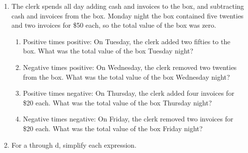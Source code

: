\documentclass[12pt]{article}
\begin{document}
\begin{enumerate}
\begin{multicols}{2}
\begin{enumerate}
    \item \hspace{0.250in} $-4-7$
  \vspace{0.25in}

    \item \hspace{0.250in} $0-(-7)$
  \vspace{0.25in}

    \item \hspace{0.250in} $10-12$
  \vspace{0.25in}

\end{enumerate}
\end{multicols}

\pagebreak

	\item The clerk spends all day adding cash and invoices to the box, and subtracting cash and invoices from the box. Monday night the box contained five twenties and two invoices for \$50 each, so the total value of the box was zero. 

    \begin{enumerate}
  	\item Positive times positive: On Tuesday, the clerk added two fifties to the box. What was the total value of the box Tuesday night? 
	    \vspace{0.50in}

	\item Negative times positive: On Wednesday, the clerk removed two twenties from the box. What was the total value of the box Wednesday night? 
	    \vspace{0.50in}

	\item Positive times negative: On Thursday, the clerk added four invoices for \$20 each. What was the total value of the box Thursday night? 
	    \vspace{0.50in}

	\item Negative times negative: On Friday, the clerk removed two invoices for \$20 each. What was the total value of the box Friday night? 
	    \vspace{0.50in}
    \end{enumerate}

    \item For a through d, simplify each expression. 
\begin{multicols}{2}
\begin{enumerate}


\end{enumerate}
\end{multicols}
\end{enumerate}
\end{document}
